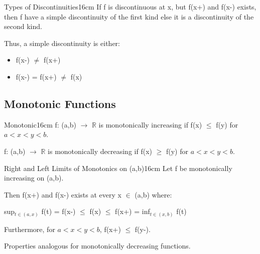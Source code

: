     \vspace{0.5cm}



    \begin{definition}{Types of Discontinuities}{16cm}
        \small
        If f is discontinuous at x, but f(x+) and f(x-) exists,
        then f have a simple discontinuity of the first kind else
        it is a discontinuity of the second kind.

        Thus, a {\color{lblue} simple discontinuity} is either:

        \begin{itemize}[leftmargin=1cm, itemsep=0.1cm]
            \item f(x-) $\not = $ f(x+)
            
            \item f(x-) = f(x+) $\not =$ f(x) 
        \end{itemize}
    \end{definition}

    \vspace{0.5cm}





\subsection{ Monotonic Functions }

    \begin{definition}{Monotonic}{16cm}
        \small
        f: (a,b) $\rightarrow$ $\mathbb{R}$ is monotonically increasing
        if f(x) $\leq$ f(y) for $a < x < y < b$.

        f: (a,b) $\rightarrow$ $\mathbb{R}$ is monotonically decreasing
        if f(x) $\geq$ f(y) for $a < x < y < b$.        
    \end{definition}

    \vspace{0.5cm}



    \begin{wtheorem}{Right and Left Limits of Monotonics on (a,b)}{16cm}
        Let f be monotonically increasing on (a,b).

        Then f(x+) and f(x-) exists at every x $\in$ (a,b) where:

        \hspace{1cm}
        sup$_{t \in (a,x)}$ f(t)
        = f(x-)
        $\leq$ f(x)
        $\leq$ f(x+)
        = inf$_{t \in (x,b)}$ f(t)

        Furthermore, for $a < x < y < b$, f(x+) $\leq$ f(y-).

        Properties analogous for monotonically decreasing functions.
    \end{wtheorem}

